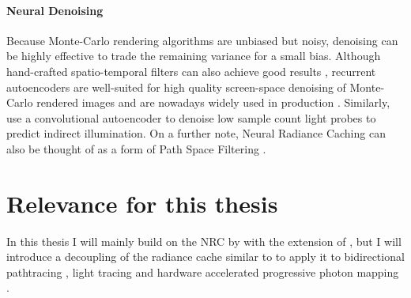 \paragraph{Neural Denoising}
Because Monte-Carlo rendering algorithms are unbiased but noisy, denoising can be highly effective to trade the remaining variance for a small bias.
Although hand-crafted spatio-temporal filters can also achieve good results , recurrent autoencoders are well-suited for high quality screen-space denoising of Monte-Carlo rendered images  and are nowadays widely used in production .
Similarly, \textcite{jiang2020} use a convolutional autoencoder to denoise low sample count light probes to predict indirect illumination.
On a further note, Neural Radiance Caching  can also be thought of as a form of Path Space Filtering . %

\section{Relevance for this thesis}
In this thesis I will mainly build on the NRC by \textcite{muller2021} with the extension of \textcite{muller2022}, but I will introduce a decoupling of the radiance cache similar to \textcite{walter1999,tole2002} to apply it to bidirectional pathtracing , light tracing  and hardware accelerated progressive photon mapping .